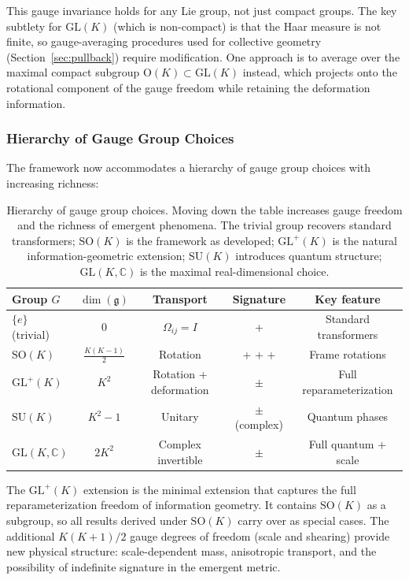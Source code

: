 \documentclass[11pt]{article}
\begin{document}
This gauge invariance holds for any Lie group, not just compact groups. The key subtlety for $\mathrm{GL}(K)$ (which is non-compact) is that the Haar measure is not finite, so gauge-averaging procedures used for collective geometry (Section~\ref{sec:pullback}) require modification. One approach is to average over the maximal compact subgroup $\mathrm{O}(K) \subset \mathrm{GL}(K)$ instead, which projects onto the rotational component of the gauge freedom while retaining the deformation information.

\subsubsection{Hierarchy of Gauge Group Choices}

The framework now accommodates a hierarchy of gauge group choices with increasing richness:

\begin{table}[h]
\centering
\small
\begin{tabular}{lcccc}
\toprule
\textbf{Group $G$} & \textbf{$\dim(\mathfrak{g})$} & \textbf{Transport} & \textbf{Signature} & \textbf{Key feature} \\
\midrule
$\{e\}$ (trivial) & 0 & $\Omega_{ij} = I$ & + & Standard transformers \\
$\mathrm{SO}(K)$ & $\frac{K(K-1)}{2}$ & Rotation & + + + & Frame rotations \\
$\mathrm{GL}^+(K)$ & $K^2$ & Rotation + deformation & $\pm$ & Full reparameterization \\
$\mathrm{SU}(K)$ & $K^2-1$ & Unitary & $\pm$ (complex) & Quantum phases \\
$\mathrm{GL}(K,\mathbb{C})$ & $2K^2$ & Complex invertible & $\pm$ & Full quantum + scale \\
\bottomrule
\end{tabular}
\caption{Hierarchy of gauge group choices. Moving down the table increases gauge freedom and the richness of emergent phenomena. The trivial group recovers standard transformers; $\mathrm{SO}(K)$ is the framework as developed; $\mathrm{GL}^+(K)$ is the natural information-geometric extension; $\mathrm{SU}(K)$ introduces quantum structure; $\mathrm{GL}(K,\mathbb{C})$ is the maximal real-dimensional choice.}
\label{tab:gauge_hierarchy}
\end{table}

The $\mathrm{GL}^+(K)$ extension is the minimal extension that captures the full reparameterization freedom of information geometry. It contains $\mathrm{SO}(K)$ as a subgroup, so all results derived under $\mathrm{SO}(K)$ carry over as special cases. The additional $K(K+1)/2$ gauge degrees of freedom (scale and shearing) provide new physical structure: scale-dependent mass, anisotropic transport, and the possibility of indefinite signature in the emergent metric.
\end{document}

